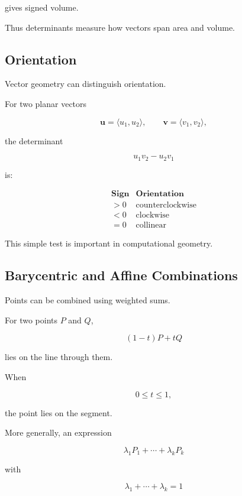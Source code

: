 gives signed volume.

Thus determinants measure how vectors span area and volume.

\subsection{Orientation}
\label{subsec:vector-orientation}

Vector geometry can distinguish orientation.

For two planar vectors

\[
\mathbf{u}=\langle u_1,u_2\rangle,\qquad
\mathbf{v}=\langle v_1,v_2\rangle,
\]

the determinant

\[ u_1v_2-u_2v_1 \]

is:

\[
\begin{array}{c|c}
\textbf{Sign} & \textbf{Orientation}\\
\hline
>0 & \text{counterclockwise}\\
<0 & \text{clockwise}\\
=0 & \text{collinear}
\end{array}
\]

This simple test is important in computational geometry.

\subsection{Barycentric and Affine Combinations}
\label{subsec:vector-affine-combinations}

Points can be combined using weighted sums.

For two points \(P\) and \(Q\),

\[ (1-t)P+tQ \]

lies on the line through them.

When

\[ 0\leq t\leq1, \]

the point lies on the segment.

More generally, an expression

\[
\lambda_1P_1+\cdots+\lambda_kP_k
\]

with

\[ \lambda_1+\cdots+\lambda_k=1 \]

